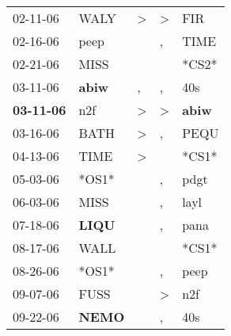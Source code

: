 \begin{supertabular}{p{0.07\textwidth}p{0.06\textwidth}p{0.02\textwidth}p{0.02\textwidth}p{0.06\textwidth}}
          02-11-06\textsuperscript{} &           WALY\textsuperscript{} &     \textgreater &     \textgreater &            FIR\textsuperscript{} \\
          02-16-06\textsuperscript{} &           peep\textsuperscript{} &                  &                , &           TIME\textsuperscript{} \\
          02-21-06\textsuperscript{} &           MISS\textsuperscript{} &                  &                  &                            *CS2* \\
          03-11-06\textsuperscript{} &  \textbf{abiw\textsuperscript{}} &                , &                , &            40s\textsuperscript{} \\
 \textbf{03-11-06\textsuperscript{}} &            n2f\textsuperscript{} &     \textgreater &     \textgreater &  \textbf{abiw\textsuperscript{}} \\
          03-16-06\textsuperscript{} &           BATH\textsuperscript{} &     \textgreater &                , &           PEQU\textsuperscript{} \\
          04-13-06\textsuperscript{} &           TIME\textsuperscript{} &     \textgreater &                  &                            *CS1* \\
          05-03-06\textsuperscript{} &                            *OS1* &                  &                , &           pdgt\textsuperscript{} \\
          06-03-06\textsuperscript{} &           MISS\textsuperscript{} &                  &                , &           layl\textsuperscript{} \\
          07-18-06\textsuperscript{} &  \textbf{LIQU\textsuperscript{}} &                  &                , &           pana\textsuperscript{} \\
          08-17-06\textsuperscript{} &           WALL\textsuperscript{} &                  &                  &                            *CS1* \\
          08-26-06\textsuperscript{} &                            *OS1* &                  &                , &           peep\textsuperscript{} \\
          09-07-06\textsuperscript{} &           FUSS\textsuperscript{} &                  &     \textgreater &            n2f\textsuperscript{} \\
          09-22-06\textsuperscript{} &  \textbf{NEMO\textsuperscript{}} &                  &                , &            40s\textsuperscript{} \\

\end{supertabular}
